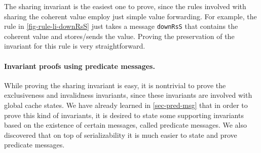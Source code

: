 \documentclass[sigplan,10pt,review,anonymous,screen]{acmart}\settopmatter{printfolios=true,printccs=false,printacmref=false}
\def\slstinline{\lstinline[basicstyle=\ttfamily\small]}
\begin{document}
The sharing invariant is the easiest one to prove, since the rules involved with sharing the coherent value employ just simple value forwarding.
For example, the rule in \autoref{fig-rule-li-downRsS} just takes a message \slstinline{downRsS} that contains the coherent value and stores/sends the value.
Proving the preservation of the invariant for this rule is very straightforward.

\paragraph{Invariant proofs using predicate messages.}

While proving the sharing invariant is easy, it is nontrivial to prove the exclusiveness and invalidness invariants, since these invariants are involved with global cache states.
We have already learned in \autoref{sec-pred-msg} that in order to prove this kind of invariants, it is desired to state some supporting invariants based on the existence of certain messages, called predicate messages.
We also discovered that on top of serializability it is much easier to state and prove predicate messages.

\newcommand{\subtree}[1]{\ensuremath{\textrm{tr}\,(#1)}}
\newcommand{\subtreec}[1]{\ensuremath{\textrm{tr}^{-1}\,(#1)}}
\newcommand{\objsinv}[1]{\ensuremath{\textsf{Invalid}\;(#1)}}
\end{document}
